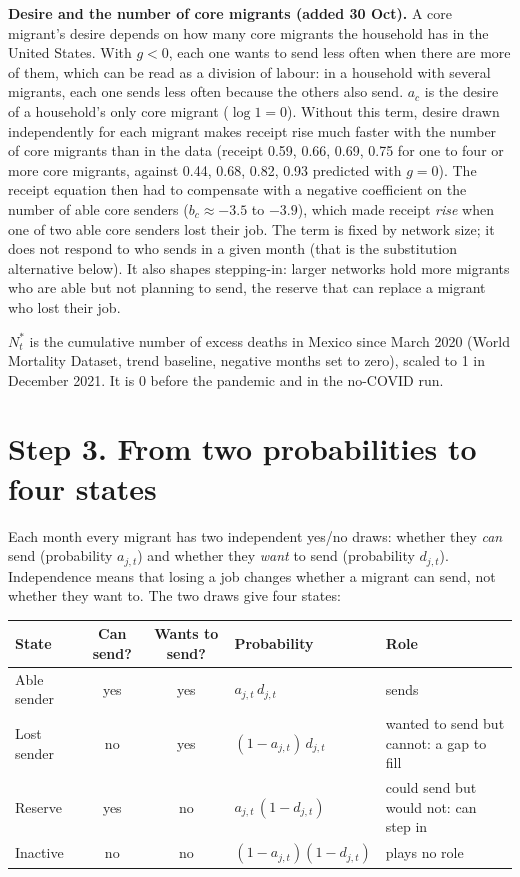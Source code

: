 \documentclass[11pt]{article}
\begin{document}
\textbf{Desire and the number of core migrants (added 30 Oct).} A core migrant's desire depends on how many core migrants the household has in the United States. With $g < 0$, each one wants to send less often when there are more of them, which can be read as a division of labour: in a household with several migrants, each one sends less often because the others also send. $a_c$ is the desire of a household's only core migrant ($\log 1 = 0$). Without this term, desire drawn independently for each migrant makes receipt rise much faster with the number of core migrants than in the data (receipt 0.59, 0.66, 0.69, 0.75 for one to four or more core migrants, against 0.44, 0.68, 0.82, 0.93 predicted with $g = 0$). The receipt equation then had to compensate with a negative coefficient on the number of able core senders ($b_c \approx -3.5$ to $-3.9$), which made receipt \emph{rise} when one of two able core senders lost their job. The term is fixed by network size; it does not respond to who sends in a given month (that is the substitution alternative below). It also shapes stepping-in: larger networks hold more migrants who are able but not planning to send, the reserve that can replace a migrant who lost their job.

$N^*_t$ is the cumulative number of excess deaths in Mexico since March 2020 (World Mortality Dataset, trend baseline, negative months set to zero), scaled to 1 in December 2021. It is 0 before the pandemic and in the no-COVID run.

\section*{Step 3. From two probabilities to four states}

Each month every migrant has two independent yes/no draws: whether they \emph{can} send (probability $a_{j,t}$) and whether they \emph{want} to send (probability $d_{j,t}$). Independence means that losing a job changes whether a migrant can send, not whether they want to. The two draws give four states:

\begin{center}
\begin{tabular}{lccll}
\toprule
State & Can send? & Wants to send? & Probability & Role \\
\midrule
Able sender & yes & yes & $a_{j,t}\,d_{j,t}$ & sends \\
Lost sender & no & yes & $(1 - a_{j,t})\,d_{j,t}$ & wanted to send but cannot: a gap to fill \\
Reserve & yes & no & $a_{j,t}\,(1 - d_{j,t})$ & could send but would not: can step in \\
Inactive & no & no & $(1 - a_{j,t})(1 - d_{j,t})$ & plays no role \\
\bottomrule
\end{tabular}
\end{center}
\end{document}
